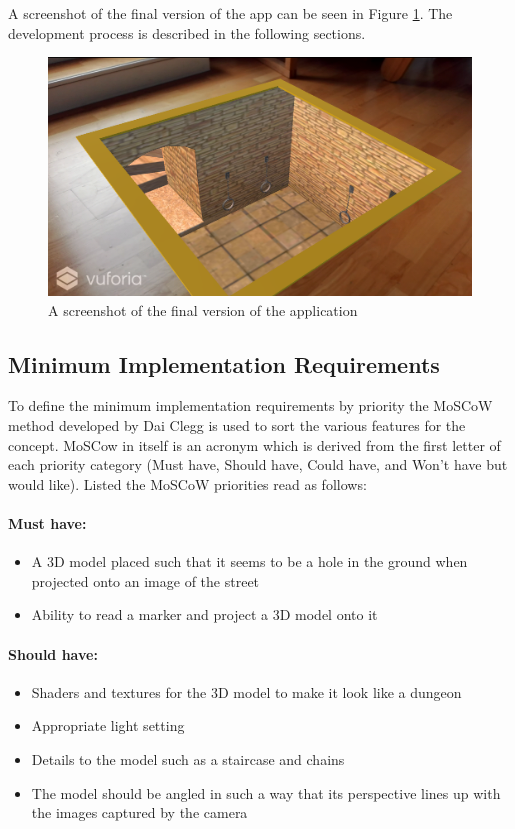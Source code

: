 A screenshot of the final version of the app can be seen in Figure \ref{fig:final_screenshot}. The development process is described in the following sections.

\begin{figure}[h!]
   \centering
   \includegraphics[width=\textwidth]{figures/final_screenshot.png}
   \caption{A screenshot of the final version of the application}\label{fig:final_screenshot}
\end{figure}

\subsection{Minimum Implementation Requirements}
To define the minimum implementation requirements by priority the MoSCoW method developed by Dai Clegg \cite{Kuhn2009} is used to sort the various features for the concept. MoSCow in itself is an acronym which is derived from the first letter of each priority category (Must have, Should have, Could have, and Won’t have but would like). Listed the MoSCoW priorities read as follows:

\paragraph{Must have:}
\begin{itemize}
\item A 3D model placed such that it seems to be a hole in the ground when projected onto an image of the street
\item Ability to read a marker and project a 3D model onto it
\end{itemize}

\paragraph{Should have:}
\begin{itemize}
\item Shaders and textures for the 3D model to make it look like a dungeon
\item Appropriate light setting
\item Details to the model such as a staircase and chains
\item The model should be angled in such a way that its perspective lines up with the images captured by the camera
\end{itemize}

